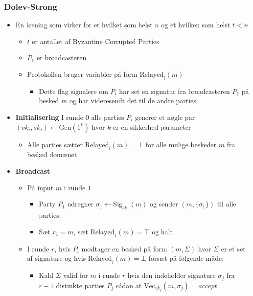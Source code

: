 \documentclass[a4, english]{article}
\begin{document}
\subsubsection{Dolev-Strong}
\begin{itemize}
	\item En løsning som virker for et hvilket som helst $n$ og et hvilken som helst $t<n$ 
  \begin{itemize}
  	\item $t$ er antallet af Byzantine Corrupted Parties 
    \item $P_1$ er broadcasteren
    \item Protokollen bruger variabler på form $\text{Relayed}_i(m)$
    \begin{itemize}
    	\item Dette flag signalere om $P_i$ har set en signatur fra broadcasteren $P_1$ på besked $m$ og har videresendt det til de andre parties 
    \end{itemize}
  \end{itemize}
  \item \textbf{Initialisering} I runde 0 alle parties $P_i$ generer et nøgle par $(vk_i,sk_i) \leftarrow \text{Gen}(1^k)$ hvor $k$ er en sikkerhed parameter
  \begin{itemize}
  	\item Alle parties sætter $\text{Relayed}_i(m) = \bot$ for alle mulige beskeder $m$ fra besked domænet	
  \end{itemize}
  \item \textbf{Broadcast}
  \begin{itemize}
  	\item På input $m$ i runde $1$ 
    \begin{itemize}
    	\item Party $P_1$ udregner $\sigma_1 \leftarrow \text{Sig}_{sk_1}(m)$ og sender $(m, \{\sigma_1\})$ til alle parties.
  		\item Sæt $r_1=m$, sæt $\text{Relayed}_1(m) = \top$ og halt
    \end{itemize}
    \item I runde $r$, hvis $P_i$ modtager en besked på form $(m, \Sigma)$ hvor $\Sigma$ er et set af signature og hvis $\text{Relayed}_i(m)=\bot$ forsæt på følgende måde:
    \begin{itemize}
    	\item Kald $\Sigma$ valid for $m$ i runde $r$ hvis den indeholder signature $\sigma_j$ fra $r-1$ distinkte parties $P_j$ sådan at $\text{Vec}_{vk_j}(m,\sigma_j) = accept$

\end{itemize}
\end{itemize}
\end{itemize}
\end{document}

